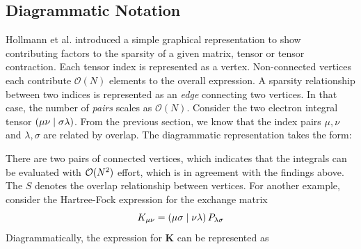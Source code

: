

\subsection{Diagrammatic Notation}

Hollmann et al. \cite{Hol2017} introduced a simple graphical representation to show contributing factors to the sparsity of a given matrix, tensor or tensor contraction. Each tensor index is represented as a vertex. Non-connected vertices each contribute $\mathcal{O}(N)$ elements to the overall expression. A sparsity relationship between two indices is represented as an \emph{edge} connecting two vertices. In that case, the number of \emph{pairs} scales as $\mathcal{O}(N)$. Consider the two electron integral tensor $\left( \mu\nu \mid \sigma\lambda \right)$. From the previous section, we know that the index pairs $\mu,\nu$ and $\lambda,\sigma$ are related by overlap. The diagrammatic representation takes the form:
\begin{center}
\end{center}
\noindent There are two pairs of connected vertices, which indicates that the integrals can be evaluated with $\mathcal{O}(N^{2})$ effort, which is in agreement with the findings above. The $S$ denotes the overlap relationship between vertices.
For another example, consider the Hartree-Fock expression for the exchange matrix
\begin{equation}
K_{\mu\nu} = \left( \mu\sigma \mid \nu\lambda \right) P_{\lambda\sigma}
\end{equation}
\noindent Diagrammatically, the expression for $\mathbf{K}$ can be represented as
